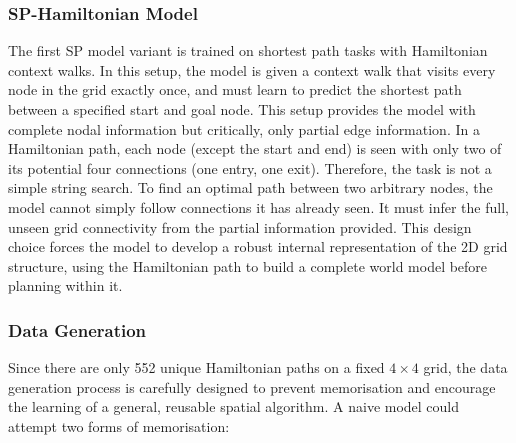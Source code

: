 \subsubsection{SP-Hamiltonian Model}

The first SP model variant is trained on shortest path tasks with Hamiltonian context walks. In this setup, the model is given a context walk that visits every node in the grid exactly once, and must learn to predict the shortest path between a specified start and goal node. This setup provides the model with complete nodal information but critically, only partial edge information. In a Hamiltonian path, each node (except the start and end) is seen with only two of its potential four connections (one entry, one exit). Therefore, the task is not a simple string search. To find an optimal path between two arbitrary nodes, the model cannot simply follow connections it has already seen. It must infer the full, unseen grid connectivity from the partial information provided. This design choice forces the model to develop a robust internal representation of the 2D grid structure, using the Hamiltonian path to build a complete world model before planning within it.

\subsubsection*{Data Generation}
Since there are only 552 unique Hamiltonian paths on a fixed $4\times4$ grid, the data generation process is carefully designed to prevent memorisation and encourage the learning of a general, reusable spatial algorithm. A naive model could attempt two forms of memorisation:

